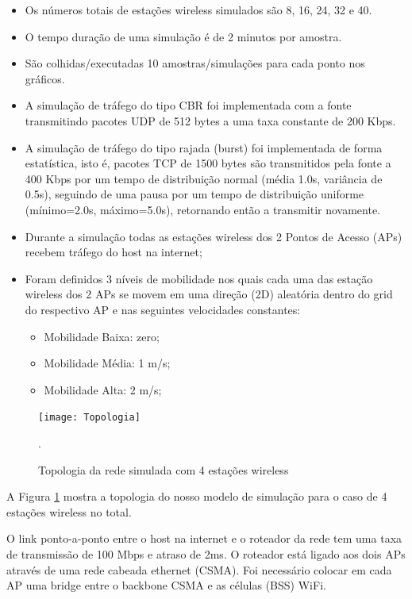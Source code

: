 \documentclass[12pt,twoside,a4paper]{article}
\begin{document}
\begin{itemize}
\item Os números totais de estações wireless simulados são 8, 16, 24, 32 e 40.

\item O tempo duração de uma simulação é de 2 minutos por amostra.

\item São colhidas/executadas 10 amostras/simulações para cada ponto nos gráficos.

\item A simulação de tráfego do tipo CBR foi implementada com a fonte transmitindo pacotes UDP de 512 bytes a uma taxa constante de 200 Kbps.

\item A simulação de tráfego do tipo rajada (burst) foi implementada de forma estatística, isto é, pacotes TCP de 1500 bytes são transmitidos pela fonte a 400 Kbps por um tempo de distribuição normal (média 1.0s, variância de 0.5s), seguindo de uma pausa por um tempo de distribuição uniforme (mínimo=2.0s, máximo=5.0s), retornando então a transmitir novamente.

\item Durante a simulação todas as estações wireless dos 2 Pontos de Acesso (APs) recebem tráfego do host na internet;

\item Foram definidos 3 níveis de mobilidade nos quais cada uma das estação wireless dos 2 APs se movem em uma direção (2D) aleatória dentro do grid do respectivo AP e nas seguintes velocidades constantes:
\begin{itemize}
\item Mobilidade Baixa: zero;
\item Mobilidade Média: 1 m/s; 
\item Mobilidade Alta: 2 m/s;
\end{itemize}

\end{itemize}

\begin{figure}[H]
\centering
\texttt{[image: Topologia]}
\caption{Topologia da rede simulada com 4 estações wireless}.
\label{fig:topologia}
\end{figure}

A Figura \ref{fig:topologia} mostra a topologia do nosso modelo de simulação para o caso de 4 estações wireless no total. 

O link ponto-a-ponto entre o host na internet e o roteador da rede tem uma taxa de transmissão de 100 Mbps e atraso de 2ms. O roteador está ligado aos dois APs através de uma rede cabeada ethernet (CSMA). Foi necessário colocar em cada AP uma bridge entre o backbone CSMA e as células (BSS) WiFi.
\end{document}
